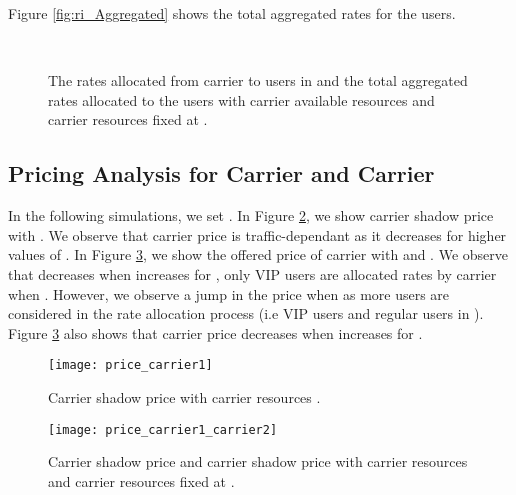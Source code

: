 \documentclass[journal]{IEEEtran} 				\IEEEoverridecommandlockouts 						\usepackage{amsmath,amssymb}
\begin{document}
Figure \ref{fig:ri_Aggregated} shows the total aggregated rates  for the  users.

\begin{figure}[tb]
  \centering
  \\\caption{The rates  allocated from carrier  to users in  and the total aggregated rates allocated to the  users with carrier  available resources  and carrier  resources fixed at .}
\label{fig:ri_carrier2}
\end{figure}
\subsection{Pricing Analysis for Carrier  and Carrier }
In the following simulations, we set . In Figure \ref{fig:price_carrier1}, we show carrier  shadow price with . We observe that carrier  price  is traffic-dependant as it decreases for higher values of . In Figure \ref{fig:price_carrier1_carrier2}, we show the offered price of carrier  with  and . We observe that  decreases when  increases for , only VIP users are allocated rates by carrier  when . However, we observe a jump in the price when  as more users are considered in the rate allocation process (i.e VIP users and regular users in ). Figure \ref{fig:price_carrier1_carrier2} also shows that carrier  price  decreases when  increases for .
\begin{figure}
\centering
\texttt{[image: price\_carrier1]}
\caption{Carrier  shadow price  with carrier  resources .}
\label{fig:price_carrier1}
\end{figure}

\begin{figure}[tb]
\centering
\texttt{[image: price\_carrier1\_carrier2]}
\caption{Carrier  shadow price  and carrier  shadow price  with carrier  resources  and carrier  resources fixed at .}
\label{fig:price_carrier1_carrier2}
\end{figure}
\end{document}
